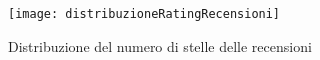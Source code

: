 \begin{figure}[H]
    \texttt{[image: distribuzioneRatingRecensioni]}\centering
    \caption{Distribuzione del numero di stelle delle recensioni}\label{fig:distribuzioneRatingRecensioni}
\end{figure}

